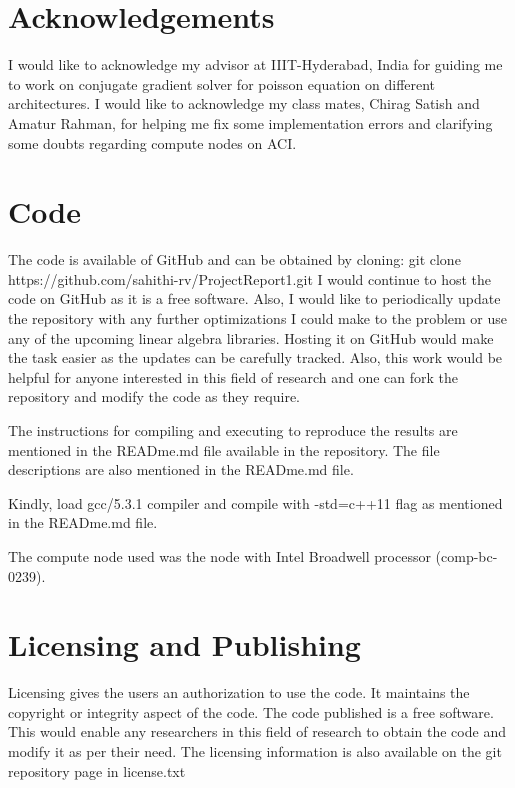\documentclass{article}
\begin{document}
\begin{spacing}{1.1}
\newpage
\begin{appendices}

\section{Acknowledgements}

I would like to acknowledge my advisor at IIIT-Hyderabad, India for guiding me to work on conjugate gradient solver for poisson equation on different architectures. I would like to acknowledge my class mates, Chirag Satish and Amatur Rahman, for helping me fix some implementation errors and clarifying some doubts regarding compute nodes on ACI.

\section{Code}

The code is available of GitHub and can be obtained by cloning:
git clone https://github.com/sahithi-rv/ProjectReport1.git
I would continue to host the code on GitHub as it is a free software. Also, I would like to periodically update the repository with any further optimizations I could make to the problem or use any of the upcoming linear algebra libraries. Hosting it on GitHub would make the task easier as the updates can be carefully tracked. Also, this work would be helpful for anyone interested in this field of research and one can fork the repository and modify the code as they require. 

The instructions for compiling and executing to reproduce the results are mentioned in the READme.md file available in the repository. The file descriptions are also mentioned in the READme.md file.

Kindly, load gcc/5.3.1 compiler and compile with -std=c++11 flag as mentioned in the READme.md file.

The compute node used was the node with Intel Broadwell processor (comp-bc-0239).

\section{Licensing and Publishing}
	Licensing gives the users an authorization to use the code. It maintains the copyright or integrity aspect of the code. 
	The code published is a free software.\\
	 This would enable any researchers in this field of research to obtain the code and modify it as per their need.
	The licensing information is also available on the git repository page in license.txt

\end{appendices}




\end{spacing}
\end{document}
